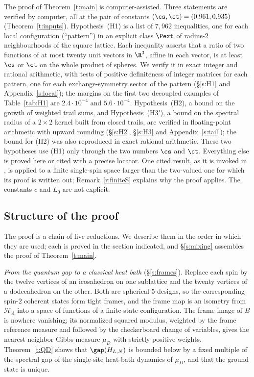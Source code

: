 The proof of Theorem~\ref{t:main} is computer-assisted. Three statements are verified by computer, all at the pair of constants $(\cs, \ct) = (0.961, 0.935)$ (Theorem~\ref{t:inputs}). Hypothesis~(H1) is a list of $7{,}962$ inequalities, one for each local configuration (``pattern'') in an explicit class $\Pext$ of radius-$2$ neighbourhoods of the square lattice. Each inequality asserts that a ratio of two functions of at most twenty unit vectors in $\R^3$, affine in each vector, is at least $\cs$ or $\ct$ on the whole product of spheres. We verify it in exact integer and rational arithmetic, with tests of positive definiteness of integer matrices for each pattern, one for each exchange-symmetry sector of the pattern (\S\ref{s:H1} and Appendix~\ref{s:local}); the margins on the first two decoupled examples of Table~\ref{tab:H1} are $2.4 \cdot 10^{-4}$ and $5.6 \cdot 10^{-4}$. Hypothesis~(H2), a bound on the growth of weighted trail sums, and Hypothesis~(H3$'$), a bound on the spectral radius of a $2 \times 2$ kernel built from closed trails, are verified in floating-point arithmetic with upward rounding (\S\ref{s:H2}, \S\ref{s:H3} and Appendix~\ref{s:tail}); the bound for (H2) was also reproduced in exact rational arithmetic. These two hypotheses use (H1) only through the two numbers $\cs$ and $\ct$. Everything else is proved here or cited with a precise locator. One cited result, \cite[Theorem~4.1]{MO94} as it is invoked in \cite{MOS94}, is applied to a finite single-spin space larger than the two-valued one for which its proof is written out; Remark~\ref{r:finiteS} explains why the proof applies. The constants $c$ and $L_0$ are not explicit.

\subsection{Structure of the proof}

The proof is a chain of five reductions. We describe them in the order in which they are used; each is proved in the section indicated, and \S\ref{s:mixing} assembles the proof of Theorem~\ref{t:main}.

\emph{From the quantum gap to a classical heat bath} (\S\ref{s:frames}). Replace each spin by the twelve vertices of an icosahedron on one sublattice and the twenty vertices of a dodecahedron on the other. Both are spherical $5$-designs, so the corresponding spin-$2$ coherent states form tight frames, and the frame map is an isometry from $\mathcal H_\Lambda$ into a space of functions of a finite-state configuration. The frame image of $B$ is nowhere vanishing; its normalized squared modulus, weighted by the frame reference measure and followed by the checkerboard change of variables, gives the nearest-neighbor Gibbs measure $\mu_D$ with strictly positive weights. Theorem~\ref{t:QD} shows that $\gap(H_{L, N})$ is bounded below by a fixed multiple of the spectral gap of the single-site heat-bath dynamics of $\mu_D$, and that the ground state is unique.

